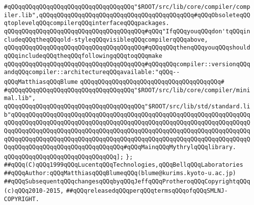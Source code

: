 \verb|#qQQqqQQqqQQqqQQqqQQqqQQqqQQqqQQqqQQq"$ROOT/src/lib/core/compiler/compiler.lib",qQQqqQQqqQQqqQQqqQQqqQQqqQQqqQQqqQQqqQQqqQQq#qQQqObsoleteqQQqtoplevelqQQqcompilerqQQqinterfaceqQQqpackages.|\newline
\newline
\verb|qQQqqQQqqQQqqQQqqQQqqQQqqQQqqQQqqQQqqQQq#qQQq"IfqQQqyouqQQqdon'tqQQqincludeqQQqtheqQQqold-styleqQQqvisibleqQQqcompilerqQQqabove,|\newline
\verb|qQQqqQQqqQQqqQQqqQQqqQQqqQQqqQQqqQQqqQQq#qQQqqQQqthenqQQqyouqQQqshouldqQQqincludeqQQqtheqQQqfollowingqQQqtoqQQqmake|\newline
\verb|qQQqqQQqqQQqqQQqqQQqqQQqqQQqqQQqqQQqqQQq#qQQqqQQqcompiler::versionqQQqandqQQqcompiler::architectureqQQqavailable:"qQQq--qQQqMatthiasqQQqBlume|\newline
\verb|qQQqqQQqqQQqqQQqqQQqqQQqqQQqqQQqqQQqqQQq#|\newline
\verb|#qQQqqQQqqQQqqQQqqQQqqQQqqQQqqQQqqQQq"$ROOT/src/lib/core/compiler/minimal.lib",|\newline
\newline
\verb|qQQqqQQqqQQqqQQqqQQqqQQqqQQqqQQqqQQqqQQq"$ROOT/src/lib/std/standard.lib"qQQqqQQqqQQqqQQqqQQqqQQqqQQqqQQqqQQqqQQqqQQqqQQqqQQqqQQqqQQqqQQqqQQqqQQqqQQqqQQqqQQqqQQqqQQqqQQqqQQqqQQqqQQqqQQqqQQqqQQqqQQqqQQqqQQqqQQqqQQqqQQqqQQqqQQqqQQqqQQqqQQqqQQqqQQqqQQqqQQqqQQqqQQqqQQqqQQqqQQqqQQqqQQqqQQqqQQqqQQqqQQqqQQqqQQqqQQqqQQqqQQqqQQqqQQqqQQqqQQqqQQqqQQqqQQqqQQqqQQqqQQqqQQqqQQqqQQqqQQqqQQqqQQqqQQq#qQQqMainqQQqMythrylqQQqlibrary.|\newline
\verb|qQQqqQQqqQQqqQQqqQQqqQQqqQQqqQQq];|\newline
\newline
\newline
\newline
\newline
\verb|};|\newline
\newline
\verb|##qQQq(C)qQQq1999qQQqLucentqQQqTechnologies,qQQqBellqQQqLaboratories|\newline
\verb|##qQQqAuthor:qQQqMatthiasqQQqBlumeqQQq(blume@kurims.kyoto-u.ac.jp)|\newline
\verb|##qQQqSubsequentqQQqchangesqQQqbyqQQqJeffqQQqProtheroqQQqCopyrightqQQq(c)qQQq2010-2015,|\newline
\verb|##qQQqreleasedqQQqperqQQqtermsqQQqofqQQqSMLNJ-COPYRIGHT.|\newline

